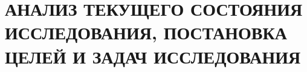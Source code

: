 \chapter{АНАЛИЗ ТЕКУЩЕГО СОСТОЯНИЯ ИССЛЕДОВАНИЯ, ПОСТАНОВКА ЦЕЛЕЙ И ЗАДАЧ ИССЛЕДОВАНИЯ}\label{ch:ch1}

% 






